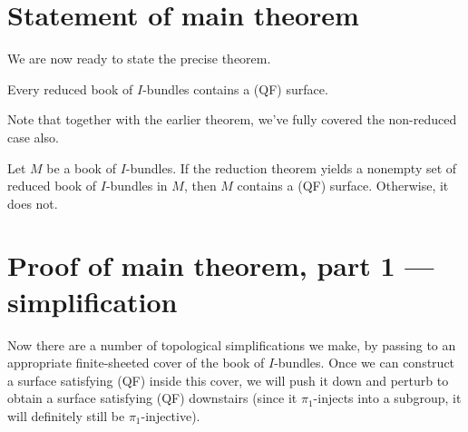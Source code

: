 \section{Statement of main theorem}

We are now ready to state the precise theorem.

\begin{thm}

Every reduced book of $I$-bundles contains a (QF) surface.

\end{thm}

Note that together with the earlier theorem, we've fully covered the
non-reduced case also.

\begin{thm}

Let $M$ be a book of $I$-bundles. If the reduction theorem yields a nonempty
set of reduced book of $I$-bundles in $M$, then $M$ contains a (QF) surface.
Otherwise, it does not.

\end{thm}

\section{Proof of main theorem, part 1 --- simplification}

Now there are a number of topological simplifications we make, by passing to an
appropriate finite-sheeted cover of the book of $I$-bundles.  Once we can
construct a surface satisfying (QF) inside this cover, we will push it down and
perturb to obtain a surface satisfying (QF) downstairs (since it
$\pi_1$-injects into a subgroup, it will definitely still be
$\pi_1$-injective).



